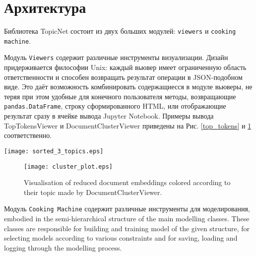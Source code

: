 \section{Архитектура}

Библиотека TopicNet состоит из двух больших модулей: \texttt{viewers} и \texttt{cooking machine}. 

Модуль \texttt{Viewers} содержит различные инструменты визуализации. Дизайн придерживается философии Unix: каждый вьювер имеет ограниченную область ответственности и способен возвращать результат операции в JSON-подобном виде. 
Это даёт возможность комбинировать содержащиесся в модуле вьюверы, не теряя при этом удобные для конечного пользователя методы, возвращающие \texttt{pandas.DataFrame}, строку сформированного HTML, или отображающие результат сразу в ячейке вывода Jupyter Notebook. Примеры вывода TopTokensViewer и DocumentClusterViewer приведены на Рис. \ref{top_tokens} и \ref{documents_clusters} соответственно.

\begin{figure*}[h]
    \centering
    \texttt{[image: sorted\_3\_topics.eps]}
    \caption{Output of the TopTokensViewer. Token score in the topic is calculated for every token, score function can be specified at the stage of a viewer initialization.}
\label{top_tokens}
\end{figure*}

\begin{figure}[h]
    \centering
    \texttt{[image: cluster\_plot.eps]}
    \caption{Visualisation of reduced document embeddings colored according to their topic made by DocumentClusterViewer.}
\label{documents_clusters}
\end{figure}



Модуль \texttt{Cooking Machine} содержит различные инструменты для моделирования, 
embodied in the semi-hierarchical structure of the main modelling classes. 
These classes are responsible for building and training model of the given structure, for selecting models according to various constraints and for saving, loading and logging through the modelling process.

